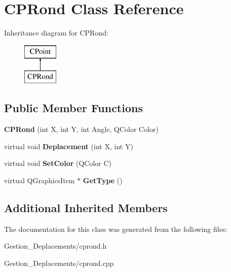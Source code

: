 \section{C\-P\-Rond Class Reference}
\label{class_c_p_rond}
Inheritance diagram for C\-P\-Rond\-:\begin{figure}[H]
\begin{center}
\leavevmode
\includegraphics[height=2.000000cm]{class_c_p_rond}
\end{center}
\end{figure}
\subsection*{Public Member Functions}
\begin{DoxyCompactItemize}
\item 
{\bfseries C\-P\-Rond} (int X, int Y, int Angle, Q\-Color Color)\label{class_c_p_rond_a7057682137723d0f9b49f5851d880b9d}

\item 
virtual void {\bfseries Deplacement} (int X, int Y)\label{class_c_p_rond_ac514e0eb265ecf836a441adbb3408909}

\item 
virtual void {\bfseries Set\-Color} (Q\-Color C)\label{class_c_p_rond_a55d9d8cd91a5db50c10f74362cf9a47e}

\item 
virtual Q\-Graphics\-Item $\ast$ {\bfseries Get\-Type} ()\label{class_c_p_rond_add68fb9c3e149f4b5d1e0cf2e1b5211d}

\end{DoxyCompactItemize}
\subsection*{Additional Inherited Members}


The documentation for this class was generated from the following files\-:\begin{DoxyCompactItemize}
\item 
Gestion\-\_\-\-Deplacements/cprond.\-h\item 
Gestion\-\_\-\-Deplacements/cprond.\-cpp\end{DoxyCompactItemize}
